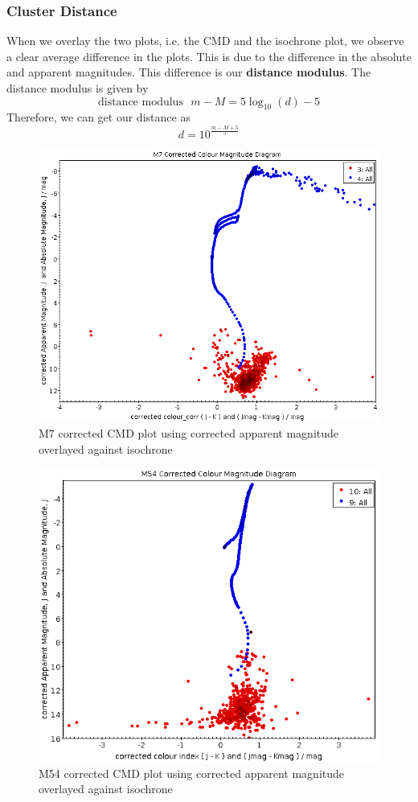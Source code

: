 \documentclass[12pt, twocolumn]{aastex62}
\begin{document}
		\subsubsection{Cluster Distance}
		When we overlay the two plots, i.e. the CMD and the isochrone plot, we observe a clear average difference in the plots. This is due to the difference in the absolute and apparent magnitudes. This difference is our \textbf{distance modulus}. The distance modulus is given by
		\[\text{distance modulus} \,\,\,\, m - M = 5\log_{10}(d) - 5\]
		Therefore, we can get our distance as
		\[d = 10^{\frac{m - M + 5}{5}}\]
		\begin{figure}
			\includegraphics[scale=0.34]{m7_cmd_distance_modulus}
			\caption{M7 corrected CMD plot using corrected apparent magnitude overlayed against isochrone}
			\label{fig: m7_cmd_distance_modulus}
		\end{figure}
		\begin{figure}
			\includegraphics[scale=0.34]{m54_cmd_distance_modulus}
			\caption{M54 corrected CMD plot using corrected apparent magnitude overlayed against isochrone}
			\label{fig: m54_cmd_distance_modulus}
		\end{figure}
\end{document}
